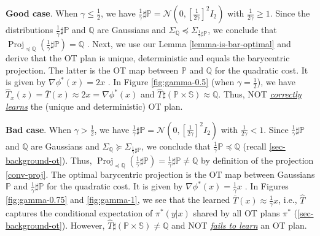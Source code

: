 \documentclass{article} %
\DeclareMathOperator{\Proj}{Proj}
\begin{document}
\vspace{-0.5mm}\textbf{Good case}. When $\gamma\leq\frac{1}{2}$, we have $\frac{1}{\gamma}\sharp\mathbb{P}=\mathcal{N}(0,[\frac{1}{2\gamma}]^2 I_{2})$ with $\frac{1}{2\gamma}\geq 1$. Since the distributions $\frac{1}{\gamma}\sharp\mathbb{P}$ and $\mathbb{Q}$ are Gaussians and $\Sigma_{\mathbb{Q}}\preceq\Sigma_{\frac{1}{\gamma}\sharp\mathbb{P}}$,  we conclude that $\Proj_{\preceq\mathbb{Q}}(\frac{1}{\gamma}\sharp\mathbb{P})=\mathbb{Q}$ \citep[Corollary 2.1]{gozlan2020mixture}. Next, we use our Lemma \ref{lemma-is-bar-optimal} and derive that the OT plan is unique, deterministic and equals the barycentric projection. The latter is the OT map between $\mathbb{P}$ and $\mathbb{Q}$ for the quadratic cost. It is given by  $\nabla\phi^{*}(x)=2x$ \citep[Theorem 2.3]{alvarez2016fixed}. In Figure \ref{fig:gamma-0.5} (when $\gamma=\frac{1}{2}$), we have $\widehat{T}_{x}(z)=\overline{T}(x)\approx 2x=\nabla\phi^{*}(x)$ and $\widehat{T}\sharp(\mathbb{P}\!\times\!\mathbb{S})\approx\mathbb{Q}$. Thus, NOT \underline{\textit{correctly learns}} the (unique and deterministic) OT plan.

\vspace{-0.5mm}\textbf{Bad case}. When $\gamma>\frac{1}{2}$, we have $\frac{1}{\gamma}\sharp\mathbb{P}=\mathcal{N}(0,[\frac{1}{2\gamma}]^2 I_{2})$ with $\frac{1}{2\gamma}<1$. Since $\frac{1}{\gamma}\sharp\mathbb{P}$ and $\mathbb{Q}$ are Gaussians and $\Sigma_{\mathbb{Q}}\succeq\Sigma_{\frac{1}{\gamma}\sharp\mathbb{P}}$, we conclude that $\frac{1}{\gamma}\mathbb{P}\preceq\mathbb{Q}$ (recall \wasyparagraph\ref{sec-background-ot}). Thus, $\Proj_{\preceq\mathbb{Q}}(\frac{1}{\gamma}\sharp\mathbb{P})=\frac{1}{\gamma}\sharp\mathbb{P}\neq \mathbb{Q}$ by definition of the projection \eqref{conv-proj}.
The optimal barycentric projection is the OT map between Gaussians $\mathbb{P}$ and $\frac{1}{\gamma}\sharp\mathbb{P}$ for the quadratic cost. It is given by $\nabla\phi^{*}(x)=\frac{1}{\gamma} x$ \citep[Theorem 2.3]{alvarez2016fixed}. In Figures \ref{fig:gamma-0.75} and \ref{fig:gamma-1}, we see that the learned  $\overline{T}(x)\approx\frac{1}{\gamma} x$, i.e., $\widehat{T}$ captures the conditional expectation of $\pi^{*}(y|x)$ shared by all OT plans $\pi^{*}$ (\wasyparagraph\ref{sec-background-ot}). However, $\widehat{T}\sharp(\mathbb{P}\!\times\!\mathbb{S})\neq\mathbb{Q}$ and NOT \underline{\textit{fails to learn}} an OT plan.
\end{document}
